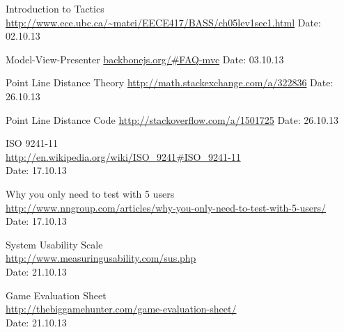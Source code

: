 \begin{thebibliography}{99}
	Introduction to Tactics\newline
	\url {http://www.ece.ubc.ca/~matei/EECE417/BASS/ch05lev1sec1.html}\newline
	Date: 02.10.13

	Model-View-Presenter\newline
	\href {http://backbonejs.org/\#FAQ-mvc}{backbonejs.org/\#FAQ-mvc}\newline
	Date: 03.10.13

	Point Line Distance Theory\newline
	\href {http://math.stackexchange.com/a/322836}{http://math.stackexchange.com/a/322836}\newline
	Date: 26.10.13

	Point Line Distance Code\newline
	\href {http://stackoverflow.com/a/1501725}{http://stackoverflow.com/a/1501725}\newline
	Date: 26.10.13

	ISO 9241-11 \\
	\href {http://en.wikipedia.org/wiki/ISO_9241#ISO_9241-11}{http://en.wikipedia.org/wiki/ISO\_9241\#ISO\_9241-11} \\
	Date: 17.10.13

	Why you only need to test with 5 users \\
	\href {http://www.nngroup.com/articles/why-you-only-need-to-test-with-5-users/}{http://www.nngroup.com/articles/why-you-only-need-to-test-with-5-users/} \\
	Date: 17.10.13

	System Usability Scale \\
	\href {http://www.measuringusability.com/sus.php}{http://www.measuringusability.com/sus.php} \\
	Date: 21.10.13 

	Game Evaluation Sheet \\
	\href {http://thebiggamehunter.com/game-evaluation-sheet/}{http://thebiggamehunter.com/game-evaluation-sheet/} \\
	Date: 21.10.13
\end{thebibliography}